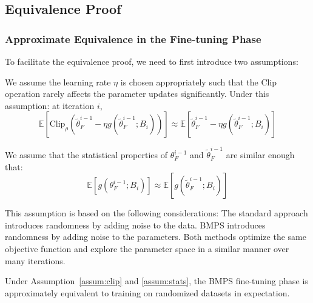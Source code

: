 \subsection{Equivalence Proof}
\subsubsection{Approximate Equivalence in the Fine-tuning Phase}
To facilitate the equivalence proof, we need to first introduce two assumptions:
\begin{assumption}
\label{assum:clip}
We assume the learning rate $\eta$ is chosen appropriately such that the Clip operation rarely affects the parameter updates significantly. Under this assumption: at iteration $i$,
\begin{equation}
    \mathbb{E}[\text{Clip}_\rho(\tilde{\theta}^{i-1}_F - \eta g(\tilde{\theta}^{i-1}_F; B_i))] \approx \mathbb{E}[\tilde{\theta}^{i-1}_F - \eta g(\tilde{\theta}^{i-1}_F; B_i)]
\end{equation}    
\end{assumption}

\begin{assumption}
\label{assum:stats}
We assume that the statistical properties of $\theta^{i-1}_F$ and $\tilde{\theta}^{i-1}_F$ are similar enough that:
\begin{equation}
    \mathbb{E}[g(\theta^{i-1}_F; B_i)] \approx \mathbb{E}[g(\tilde{\theta}^{i-1}_F; B_i)]
\end{equation}
\end{assumption}
This assumption is based on the following considerations: The standard approach introduces randomness by adding noise to the data. BMPS introduces randomness by adding noise to the parameters. Both methods optimize the same objective function and explore the parameter space in a similar manner over many iterations.

\begin{theorem}
Under Assumption~\ref{assum:clip} and \ref{assum:stats}, the BMPS fine-tuning phase is approximately equivalent to training on randomized datasets in expectation.
\end{theorem}


